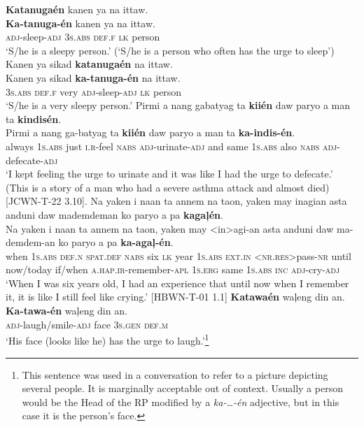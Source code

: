 \ea
\textbf{Katanugaén}  kanen  ya  na  ittaw. \\\smallskip
 \gll \textbf{Ka-tanuga-én}  kanen  ya  na  ittaw.\footnotemark \\
\textsc{adj}-sleep-\textsc{adj}  3\textsc{s.abs}  \textsc{def.f}  \textsc{lk}  person \\
\glt ‘S/he is a sleepy person.’ (‘S/he is a person who often has the urge to sleep’)
\z
\ea
Kanen  ya  sikad  \textbf{katanugaén}  na  ittaw. \\\smallskip
 \gll Kanen  ya  sikad  \textbf{ka-tanuga-én}  na  ittaw. \\
3\textsc{s.abs}  \textsc{def.f}  very  \textsc{adj}-sleep-\textsc{adj}  \textsc{lk}  person \\
\glt ‘S/he is a very sleepy person.’
\z
\ea
Pirmi  a  nang  gabatyag  ta  \textbf{kiién}  daw  paryo  a man  ta  \textbf{kindisén}. \\\smallskip
 \gll Pirmi  a  nang  ga-batyag  ta  \textbf{kiién}  daw  paryo  a man  ta  \textbf{ka-indis-én}. \\
always  1\textsc{s.abs}  just  \textsc{i.r}-feel  \textsc{nabs}  \textsc{adj}-urinate-\textsc{adj}  and  same  1\textsc{s.abs} also  \textsc{nabs}  \textsc{adj}-defecate-\textsc{adj} \\
\glt `I kept feeling the urge to urinate and it was like I had the urge to defecate.’ (This is a story of a man who had a severe asthma attack and almost died) [JCWN-T-22 3.10].
\z
\ea
Na  yaken  i  naan  ta  annem  na  taon,  yaken  may inagian  asta  anduni  daw  mademdeman  ko  paryo a  pa  \textbf{kagaļén}. \\\smallskip
 \gll Na  yaken  i  naan  ta  annem  na  taon,  yaken  may <in>agi-an  asta  anduni  daw  ma-demdem-an  ko  paryo a  pa  \textbf{ka-agaļ-én}. \\
when  1\textsc{s.abs}  \textsc{def.n}  \textsc{spat.def}  \textsc{nabs}  six  \textsc{lk}  year  1\textsc{s.abs}  \textsc{ext.in}
<\textsc{nr.res}>pass-\textsc{nr}  until  now/today  if/when  \textsc{a.hap.ir}-remember-\textsc{apl}  1\textsc{s.erg}  same 1\textsc{s.abs}  \textsc{inc}  \textsc{adj}-cry-\textsc{adj} \\
\glt `When I was six years old, I had an experience that until now when I remember it, it is like I still feel like crying.’ [HBWN-T-01 1.1]
\z
\ea
\textbf{Katawaén} waļeng  din  an. \\\smallskip
 \gll \textbf{Ka-tawa-én} waļeng  din  an. \\
\textsc{adj}-laugh/smile-\textsc{adj}  face  3\textsc{s.gen}  \textsc{def.m} \\
\glt ‘His face (looks like he) has the urge to laugh.’\footnote{This sentence was used in a conversation to refer to a picture depicting several people. It is marginally acceptable out of context. Usually a person would be the Head of the RP modified by a \textit{ka-…-én} adjective, but in this case it is the person’s face.}
\z

